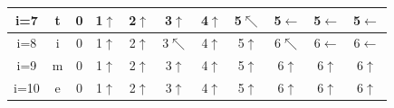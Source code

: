 \documentclass{article}
\begin{document}
\begin{multicols*}{2}
\begin{tabular}{|c|c|c|c|c|c|c|c|c|c|c|}
        \hline
        i=7                           & t                             & 0                             & 1$\uparrow$                    & 2$\uparrow$
                                      & 3$\uparrow$                   & 4$\uparrow$                   &
        \cellcolor{red!25}5$\nwarrow$ & 5$\leftarrow$                 &
        5$\leftarrow$                 & 5$\leftarrow$                                                                                                       \\
        \hline
        i=8                           & i                             & 0                             & 1$\uparrow$                    & 2$\uparrow$
                                      & 3$\nwarrow$                   & 4$\uparrow$                   &
        5$\uparrow$                   & \cellcolor{red!25}6$\nwarrow$ &
        6$\leftarrow$                 & 6$\leftarrow$                                                                                                       \\
        \hline
        i=9                           & m                             & 0                             & 1$\uparrow$                    & 2$\uparrow$
                                      & 3$\uparrow$                   & 4$\uparrow$                   &
        5$\uparrow$                   & 6$\uparrow$                   & 6$\uparrow$
                                      & 6$\uparrow$                                                                                                         \\
        \hline
        i=10                          & e                             & 0                             & 1$\uparrow$                    & 2$\uparrow$
                                      & 3$\uparrow$                   & 4$\uparrow$                   &
        5$\uparrow$                   & 6$\uparrow$                   & 6$\uparrow$
                                      & 6$\uparrow$                                                                                                         \\
        \hline
    \end{tabular}


\end{multicols*}
\end{document}

